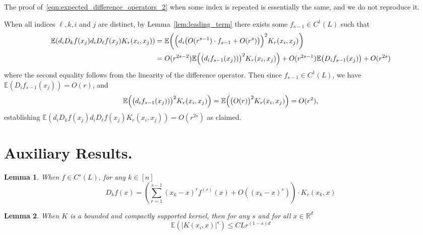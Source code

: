 \documentclass{article}
\newcommand{\Reals}{\mathbb{R}}
\newcommand{\abs}[1]{\left \lvert #1 \right \rvert}
\newcommand{\1}{\mathbf{1}}
\newcommand{\Rd}{\Reals^d}
\newcommand{\Ebb}{\mathbb{E}}
\theoremstyle{alden}
\theoremstyle{aldenthm}
\newtheorem{lemma}{Lemma}
\theoremstyle{definition}
\theoremstyle{remark}
\begin{document}
The proof of~\eqref{eqn:expected_difference_operators_2} when some index is repeated is essentially the same, and we do not reproduce it.

When all indices $\ell,k,i$ and $j$ are distinct, by Lemma~\ref{lem:leading_term} there exists some $f_{s-1} \in C^1(L)$ such that
\begin{align*}
\Ebb(d_iD_kf(x_j)d_iD_{\ell}f(x_j)K_r(x_i,x_j)) & = \Ebb\biggl(\Bigl(d_i\bigl(O(r^{s-1})\cdot f_{s - 1} + O(r^s)\bigr)\Bigr)^2K_r(x_i,x_j)\biggr) \\
& = O(r^{2s - 2})\Ebb\Bigl(\bigl(d_if_{s-1}(x_j))\bigr)^2K_{r}(x_i,x_j)\Bigr) + O(r^{2s - 1})\Ebb\bigl(D_if_{s - 1}(x_j)\bigr)+ O(r^{2s})
\end{align*}
where the second equality follows from the linearity of the difference operator. Then since $f_{s-1} \in C^1(L)$, we have $\Ebb(D_if_{s-1}(x_j)) = O(r)$, and
\begin{equation*}
\Ebb\Bigl(\bigl(d_if_{s-1}(x_j))\bigr)^2K_{r}(x_i,x_j)\Bigr) = \Ebb\Bigl(\bigl(O(r)\bigr)^2K_{r}(x_i,x_j)\Bigr) = O(r^2),
\end{equation*}
establishing $\Ebb(d_iD_kf(x_j)d_iD_{\ell}f(x_j)K_r(x_i,x_j)) = O(r^{2s})$ as claimed.
\section{Auxiliary Results.}
\begin{lemma}
	\label{lem:difference_operator_taylor}
	When $f \in C^s(L)$, for any $k \in [n]$ 
	\begin{equation*}
	D_kf(x) = \left(\sum_{r = 1}^{s - 1} (x_k - x)^r f^{(r)}(x) + O((x_k - x)^{s})\right) \cdot K_r(x_k,x)
	\end{equation*}
\end{lemma}

\begin{lemma}
	\label{lem:expected_kernel}
	When $K$ is a bounded and compactly supported kernel, then for any $s$ and for all $x \in \Rd$
	\begin{equation*}
	\Ebb(\abs{K(x_i,x)}^s) \leq CLr^{(1 - s)d}
	\end{equation*}
\end{lemma}
\end{document}
